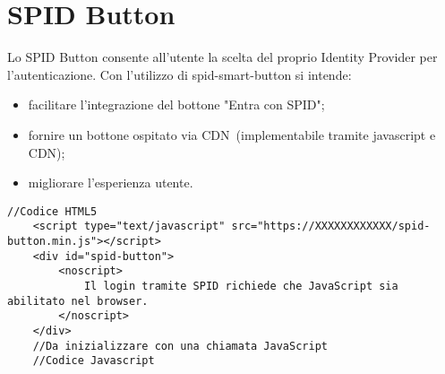 \pagebreak
\section{SPID Button}
Lo SPID Button consente all'utente la scelta del proprio Identity Provider per l'autenticazione.
Con l'utilizzo di spid-smart-button si intende:
\begin{itemize}
    \item facilitare l'integrazione del bottone "Entra con SPID";
    \item fornire un bottone ospitato via CDN\glo\ (implementabile tramite javascript e CDN);
    \item migliorare l'esperienza utente.
\end{itemize}


\begin{lstlisting}[style=htmlcssjs]
    //Codice HTML5
    <script type="text/javascript" src="https://XXXXXXXXXXXX/spid-button.min.js"></script>
    <div id="spid-button">
        <noscript> 
            Il login tramite SPID richiede che JavaScript sia abilitato nel browser.
        </noscript>
    </div>
    //Da inizializzare con una chiamata JavaScript
    //Codice Javascript
\end{lstlisting}